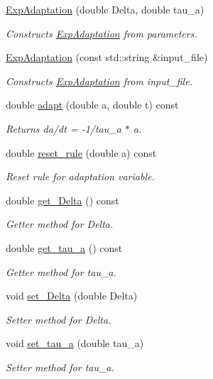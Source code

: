 \begin{DoxyCompactItemize}
\item 
\hyperlink{classExpAdaptation_a7cf74c9283d78b47b2ee49cf9bf4b3c3}{Exp\+Adaptation} (double Delta, double tau\+\_\+a)
\begin{DoxyCompactList}\small\item\em Constructs \hyperlink{classExpAdaptation}{Exp\+Adaptation} from parameters. \end{DoxyCompactList}\item 
\hyperlink{classExpAdaptation_a451a3bb8244dcd086d05c06a54865568}{Exp\+Adaptation} (const std\+::string \&input\+\_\+file)
\begin{DoxyCompactList}\small\item\em Constructs \hyperlink{classExpAdaptation}{Exp\+Adaptation} from input\+\_\+file. \end{DoxyCompactList}\item 
double \hyperlink{classExpAdaptation_aef5119a0f09698f1526938f04654e3f4}{adapt} (double a, double t) const
\begin{DoxyCompactList}\small\item\em Returns da/dt = -\/1/tau\+\_\+a $\ast$ a. \end{DoxyCompactList}\item 
double \hyperlink{classExpAdaptation_ac194bba0fd15aea6a68b8964a21fff2d}{reset\+\_\+rule} (double a) const
\begin{DoxyCompactList}\small\item\em Reset rule for adaptation variable. \end{DoxyCompactList}\item 
double \hyperlink{classExpAdaptation_ab99255b3adfe6fc0f2fcf2992f520565}{get\+\_\+\+Delta} () const
\begin{DoxyCompactList}\small\item\em Getter method for Delta. \end{DoxyCompactList}\item 
double \hyperlink{classExpAdaptation_a2fab2ad7a21e78b6984116132aed2836}{get\+\_\+tau\+\_\+a} () const
\begin{DoxyCompactList}\small\item\em Getter method for tau\+\_\+a. \end{DoxyCompactList}\item 
void \hyperlink{classExpAdaptation_aec93194aa8a695cbb26c47c40469a153}{set\+\_\+\+Delta} (double Delta)
\begin{DoxyCompactList}\small\item\em Setter method for Delta. \end{DoxyCompactList}\item 
void \hyperlink{classExpAdaptation_a9093324d5aff70f75b82f302f698d468}{set\+\_\+tau\+\_\+a} (double tau\+\_\+a)
\begin{DoxyCompactList}\small\item\em Setter method for tau\+\_\+a. \end{DoxyCompactList}\end{DoxyCompactItemize}


